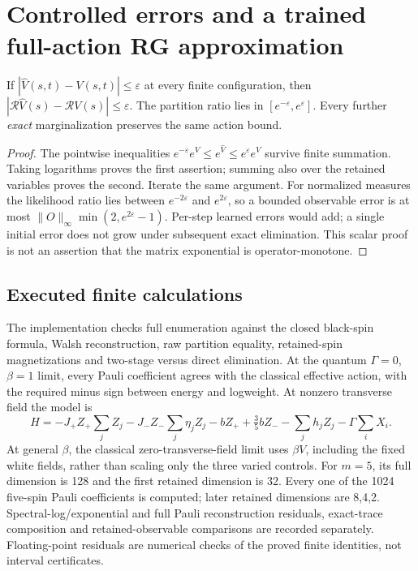 \section{Controlled errors and a trained full-action RG approximation}
\label{sec:rg-details}
\begin{proposition}
If $|\widehat V(s,t)-V(s,t)|\le\varepsilon $ at every finite configuration,
then $|\mathcal R\widehat V(s)-\mathcal RV(s)|\le\varepsilon $.
The partition ratio lies in $[e^{-\varepsilon},e^{\varepsilon}]$.
Every further \emph{exact} marginalization preserves the same action bound.
\end{proposition}
\begin{proof}
The pointwise inequalities
$ e^{-\varepsilon}e^V\le e^{\widehat V}\le e^\varepsilon e^V $
survive finite summation. Taking logarithms proves the first assertion;
summing also over the retained variables proves the second. Iterate the
same argument. For normalized measures the likelihood ratio lies between
$ e^{-2\varepsilon}$ and $ e^{2\varepsilon}$, so a bounded observable error
is at most $\|O\|_\infty\min(2,e^{2\varepsilon}-1)$. Per-step learned
errors would add; a single initial error does not grow under subsequent
exact elimination. This scalar proof is not an assertion that the matrix
exponential is operator-monotone.
\end{proof}

\subsection{Executed finite calculations}
The implementation checks full enumeration against the closed black-spin
formula, Walsh reconstruction, raw partition equality, retained-spin
magnetizations and two-stage versus direct elimination. At the quantum
$\Gamma=0$, $\beta=1$ limit, every Pauli coefficient agrees with the
classical effective action, with the required minus sign between energy
and logweight. At nonzero transverse field the model is
\[
 H=-J_+Z_+\sum_jZ_j-J_-Z_-\sum_j\eta_jZ_j-bZ_+
       +\tfrac 35 bZ_--\sum_jh_jZ_j-\Gamma\sum_iX_i.
\]
At general $\beta $, the classical zero-transverse-field limit uses $\beta V $, including the fixed white fields, rather than scaling only the three varied controls.
For $ m=5$, its full dimension is 128 and the first retained dimension is 32.
Every one of the 1024 five-spin Pauli coefficients is computed; later
retained dimensions are 8,4,2. Spectral-log/exponential and full Pauli
reconstruction residuals, exact-trace composition and retained-observable
comparisons are recorded separately. Floating-point residuals are numerical
checks of the proved finite identities, not interval certificates.

